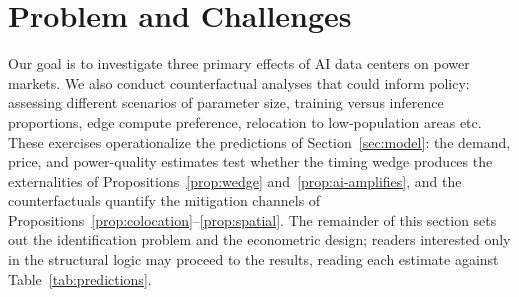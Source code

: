 \documentclass[a4paper,fleqn,longmktitle]{cas-sc}
\newcommand{\nb}[1]{\textcolor{blue}{NB[#1]}}
\theoremstyle{plain}
\theoremstyle{definition}
\begin{document}
\section{Problem and Challenges}\label{Sec::Methods}





Our goal is to investigate three primary effects of AI data centers on power markets. We also conduct counterfactual analyses that could inform policy: assessing different scenarios of parameter size, training versus inference proportions, edge compute preference, relocation to low-population areas etc. These exercises operationalize the predictions of Section~\ref{sec:model}: the demand, price, and power-quality estimates test whether the timing wedge produces the externalities of Propositions~\ref{prop:wedge} and~\ref{prop:ai-amplifies}, and the counterfactuals quantify the mitigation channels of Propositions~\ref{prop:colocation}--\ref{prop:spatial}. The remainder of this section sets out the identification problem and the econometric design; readers interested only in the structural logic may proceed to the results, reading each estimate against Table~\ref{tab:predictions}.
\end{document}
